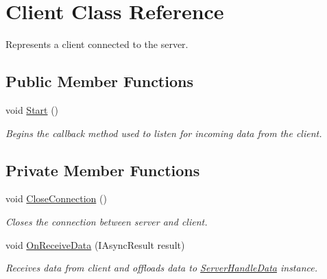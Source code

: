 \hypertarget{class_client}{}\section{Client Class Reference}
\label{class_client}


Represents a client connected to the server.  


\subsection*{Public Member Functions}
\begin{DoxyCompactItemize}
\item 
void \mbox{\hyperlink{class_client_a4d27949eb305b5b84772396a3dac9c76}{Start}} ()
\begin{DoxyCompactList}\small\item\em Begins the callback method used to listen for incoming data from the client. \end{DoxyCompactList}\end{DoxyCompactItemize}
\subsection*{Private Member Functions}
\begin{DoxyCompactItemize}
\item 
void \mbox{\hyperlink{class_client_a0853fff639f944efdb84e2537dd79328}{Close\+Connection}} ()
\begin{DoxyCompactList}\small\item\em Closes the connection between server and client. \end{DoxyCompactList}\item 
void \mbox{\hyperlink{class_client_aec3eb642e59dcdd301840d640a773165}{On\+Receive\+Data}} (I\+Async\+Result result)
\begin{DoxyCompactList}\small\item\em Receives data from client and offloads data to \mbox{\hyperlink{class_server_handle_data}{Server\+Handle\+Data}} instance. \end{DoxyCompactList}\end{DoxyCompactItemize}
